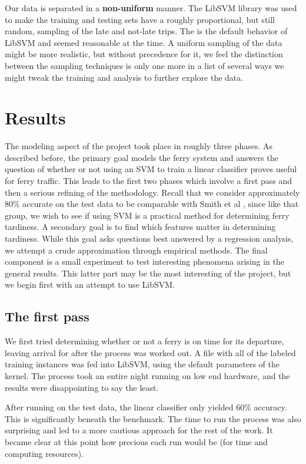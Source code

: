 \documentclass[11pt]{article} %
\begin{document}
Our data is separated in a \textbf{non-uniform} manner. The LibSVM library was
used to make the training and testing sets have a  roughly proportional, but still
random, sampling of the late and not-late trips. The is the default behavior of 
LibSVM and seemed reasonable at the time. A uniform sampling of the data might be
more realistic, but without precedence for it, we feel the distinction between
the sampling techniques is only one more in a list of several ways we might tweak
the training and analysis to further explore the data.

\section{Results}
\label{sec:results}
The modeling aspect of the project took place in roughly three phases. As 
described before, the primary goal models the ferry system and answers the 
question of whether or not using an SVM to train a linear classifier proves useful 
for ferry traffic. This leads to the first two phases
which involve a first pass and then a serious refining of the methodology.  Recall 
that we consider approximately $80\%$ accurate on the test data to be comparable
with Smith et al \cite{smith2008decision}, since like that group, we wish to see
if using SVM is a practical method for determining ferry tardiness. 
A secondary goal is to find which features matter in determining tardiness.  While
this goal asks questions best answered by a regression analysis, we 
attempt a crude approximation through empirical methods.  The final component is 
a small experiment to test interesting phenomena arising in the general results.  
This latter part may be the most interesting of the project, but we begin 
first with an attempt to use LibSVM.

\subsection{The first pass}
\label{sec:firstpass}
We first tried determining whether or not a ferry is on
time for its departure, leaving arrival for after the process was worked out. 
A file with all of the labeled training instances was fed into LibSVM, using the
default parameters of the kernel. The process took an entire night running on
low end hardware, and the results were disappointing to say the least.

After running on the test data, the linear classifier only yielded $60\%$ accuracy. 
This is significantly beneath the benchmark. The time to run the process was also
surprising and led to a more cautious approach for the rest of the work. It became
clear at this point how precious each run would be (for time and computing 
resources). 
\end{document}
